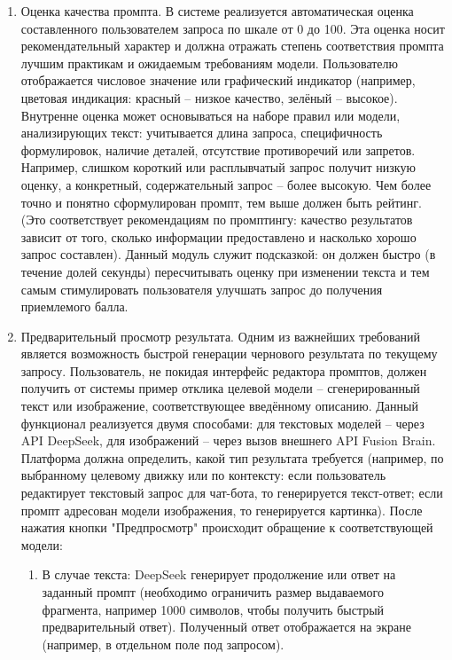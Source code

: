 \begin{enumerate}[label=\arabic*]
    \item Оценка качества промпта. В системе реализуется автоматическая оценка составленного пользователем запроса по шкале от 0 до 100. Эта оценка носит рекомендательный характер и должна отражать степень соответствия промпта лучшим практикам и ожидаемым требованиям модели. Пользователю отображается числовое значение или графический индикатор (например, цветовая индикация: красный – низкое качество, зелёный – высокое). Внутренне оценка может основываться на наборе правил или модели, анализирующих текст: учитывается длина запроса, специфичность формулировок, наличие деталей, отсутствие противоречий или запретов. Например, слишком короткий или расплывчатый запрос получит низкую оценку, а конкретный, содержательный запрос – более высокую. Чем более точно и понятно сформулирован промпт, тем выше должен быть рейтинг. (Это соответствует рекомендациям по промптингу: качество результатов зависит от того, сколько информации предоставлено и насколько хорошо запрос составлен)\cite{promptingguide:basics}. Данный модуль служит подсказкой: он должен быстро (в течение долей секунды) пересчитывать оценку при изменении текста и тем самым стимулировать пользователя улучшать запрос до получения приемлемого балла.
    \item Предварительный просмотр результата. Одним из важнейших требований является возможность быстрой генерации чернового результата по текущему запросу. Пользователь, не покидая интерфейс редактора промптов, должен получить от системы пример отклика целевой модели – сгенерированный текст или изображение, соответствующее введённому описанию. Данный функционал реализуется двумя способами: для текстовых моделей – через API DeepSeek, для изображений – через вызов внешнего API Fusion Brain. Платформа должна определить, какой тип результата требуется (например, по выбранному целевому движку или по контексту: если пользователь редактирует текстовый запрос для чат-бота, то генерируется текст-ответ; если промпт адресован модели изображения, то генерируется картинка). После нажатия кнопки "Предпросмотр" происходит обращение к соответствующей модели:
    \begin{enumerate}[label=4.\arabic*]
        \item В случае текста: DeepSeek генерирует продолжение или ответ на заданный промпт (необходимо ограничить размер выдаваемого фрагмента, например 1000 символов, чтобы получить быстрый предварительный ответ). Полученный ответ отображается на экране (например, в отдельном поле под запросом).

\end{enumerate}
\end{enumerate}
